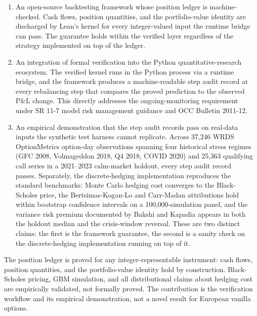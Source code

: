\documentclass[
  11pt,
  letterpaper,
  DIV=12,
  numbers=noendperiod]{scrartcl}
\numberwithin{equation}{section}
\numberwithin{figure}{section}
\numberwithin{table}{section}
\begin{document}
\begin{enumerate}
\def\labelenumi{\arabic{enumi}.}
\item
  An open-source backtesting framework whose position ledger is
  machine-checked. Cash flows, position quantities, and the
  portfolio-value identity are discharged by Lean's kernel for every
  integer-valued input the runtime bridge can pass. The guarantee holds
  within the verified layer regardless of the strategy implemented on
  top of the ledger.
\item
  An integration of formal verification into the Python
  quantitative-research ecosystem. The verified kernel runs in the
  Python process via a runtime bridge, and the framework produces a
  machine-readable step audit record at every rebalancing step that
  compares the proved prediction to the observed P\&L change. This
  directly addresses the ongoing-monitoring requirement under SR 11-7
  model risk management guidance  and OCC Bulletin 2011-12.
\item
  An empirical demonstration that the step audit records pass on
  real-data inputs the synthetic test harness cannot replicate. Across
  37,246 WRDS OptionMetrics option-day observations spanning four
  historical stress regimes (GFC 2008, Volmageddon 2018, Q4 2018, COVID
  2020) and 25,363 qualifying call series in a 2021--2023 calm-market
  holdout, every step audit record passes. Separately, the
  discrete-hedging implementation reproduces the standard benchmarks:
  Monte Carlo hedging cost converges to the Black-Scholes price, the
  Bertsimas-Kogan-Lo and Carr-Madan attributions hold within bootstrap
  confidence intervals on a 100,000-simulation panel, and the variance
  risk premium documented by Bakshi and Kapadia
   appears in both the holdout
  median and the crisis-window reversal. These are two distinct claims:
  the first is the framework guarantee, the second is a sanity check on
  the discrete-hedging implementation running on top of it.
\end{enumerate}

The position ledger is proved for any integer-representable instrument:
cash flows, position quantities, and the portfolio-value identity hold
by construction. Black-Scholes pricing, GBM simulation, and all
distributional claims about hedging cost are empirically validated, not
formally proved. The contribution is the verification workflow and its
empirical demonstration, not a novel result for European vanilla
options.
\end{document}
